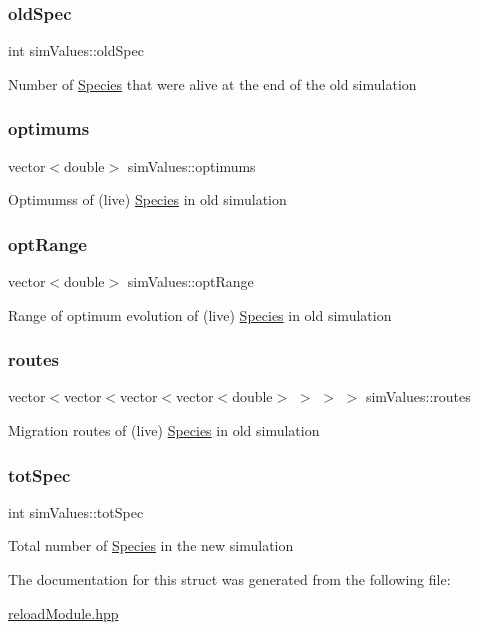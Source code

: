 \subsubsection{\texorpdfstring{old\+Spec}{oldSpec}}
{\footnotesize\ttfamily int sim\+Values\+::old\+Spec}

Number of \hyperlink{classSpecies}{Species} that were alive at the end of the old simulation \mbox{\label{structsimValues_ab00d0541616bb1d309639954b90b3e1d}} 
\subsubsection{\texorpdfstring{optimums}{optimums}}
{\footnotesize\ttfamily vector$<$double$>$ sim\+Values\+::optimums}

Optimumss of (live) \hyperlink{classSpecies}{Species} in old simulation \mbox{\label{structsimValues_a8b045e15d8493873f87bbfb99cc6c10d}} 
\subsubsection{\texorpdfstring{opt\+Range}{optRange}}
{\footnotesize\ttfamily vector$<$double$>$ sim\+Values\+::opt\+Range}

Range of optimum evolution of (live) \hyperlink{classSpecies}{Species} in old simulation \mbox{\label{structsimValues_a6745659920f5fb456202f8c84cb75a46}} 
\subsubsection{\texorpdfstring{routes}{routes}}
{\footnotesize\ttfamily vector$<$vector$<$vector$<$vector$<$double$>$ $>$ $>$ $>$ sim\+Values\+::routes}

Migration routes of (live) \hyperlink{classSpecies}{Species} in old simulation \mbox{\label{structsimValues_aeb4d9fe040a0ecb69669675753088a10}} 
\subsubsection{\texorpdfstring{tot\+Spec}{totSpec}}
{\footnotesize\ttfamily int sim\+Values\+::tot\+Spec}

Total number of \hyperlink{classSpecies}{Species} in the new simulation 

The documentation for this struct was generated from the following file\+:\begin{DoxyCompactItemize}
\item 
\hyperlink{reloadModule_8hpp}{reload\+Module.\+hpp}\end{DoxyCompactItemize}
